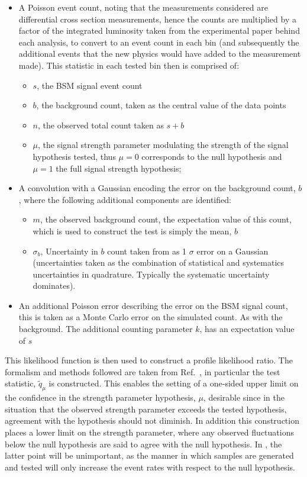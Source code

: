 \documentclass[floatfix]{article}
\begin{document}
\begin{itemize}
\item A Poisson event count, noting that the measurements considered are differential cross section measurements, hence the counts are multiplied by a factor of the integrated luminosity taken from the experimental paper behind each analysis, to convert to an event count in each bin (and subsequently the additional events that the new physics would have added to the measurement made). This statistic in each tested bin then is comprised of:
\begin{itemize}
\item $s$, the BSM signal event count
\item $b$, the background count, taken as the central value of the data points
\item $n$, the observed total count taken as $s+b$
\item $\mu$, the signal strength parameter modulating the strength of the signal hypothesis tested, thus $\mu=0$ corresponds to the null hypothesis 
and $\mu=1$ the full signal strength hypothesis;
\end{itemize}
\item A convolution with a Gaussian encoding the error on the background count, $b$, where the following additional components are identified:
\begin{itemize}
\item $m$, the observed background count, the expectation value of this count, which is used to construct the test is simply the mean, $b$
\item $\sigma_{b}$, Uncertainty in $b$ count taken from \rivet as 1 $\sigma$ error on a Gaussian (uncertainties taken as the combination of statistical and systematics uncertainties in quadrature. Typically the systematic uncertainty dominates).
\end{itemize}
\item An additional Poisson error describing the error on the BSM signal count, this is taken as a Monte Carlo error on the simulated count. As with the background. The additional counting parameter $k$, has an expectation value of $s$
\end{itemize}

This likelihood function is then used to construct a profile likelihood ratio. The formalism and methods followed are taken from 
Ref.~\cite{Cowan:2010js}, in particular the test statistic, $\tilde{q}_{\mu}$ is constructed. This enables the setting of a one-sided upper limit on the confidence 
in the strength parameter hypothesis, $\mu$, desirable since in the situation that the observed strength parameter exceeds the tested hypothesis, agreement with 
the hypothesis should not diminish. In addition this construction places a lower limit on the strength parameter, where any observed fluctuations below the null 
hypothesis are said to agree with the null hypothesis. In \Contur, the latter point will be unimportant, as the manner in which samples are 
generated and tested will only increase the event rates with respect to the null hypothesis. 
\end{document}
